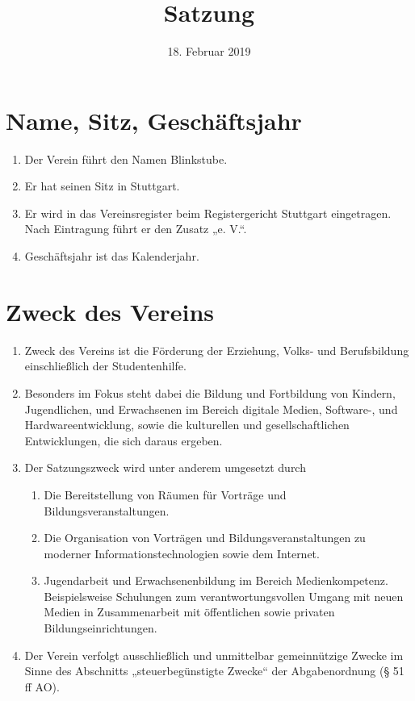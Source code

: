 \documentclass[a4paper, 12pt]{scrartcl}
\title{Satzung}
\subtitle{\verein}
\author{}
\date{18. Februar 2019}
\newcommand\verein{Blinkstube}
\begin{document}
\maketitle
\sffamily

\section{Name, Sitz, Geschäftsjahr}
\begin{enumerate}
  \item Der Verein führt den Namen \verein.
  \item Er hat seinen Sitz in Stuttgart.
  \item Er wird in das Vereinsregister beim Registergericht Stuttgart eingetragen. Nach Eintragung führt er den Zusatz „e. V.“.
  \item Geschäftsjahr ist das Kalenderjahr.
\end{enumerate}

\section{Zweck des Vereins}
\begin{enumerate}
  \item Zweck des Vereins ist die Förderung der Erziehung, Volks- und Berufsbildung einschließlich der Studentenhilfe.
  \item Besonders im Fokus steht dabei die Bildung und Fortbildung von Kindern, Jugendlichen, und Erwachsenen im Bereich digitale Medien, Software-, und Hardwareentwicklung, sowie die kulturellen und gesellschaftlichen Entwicklungen, die sich daraus ergeben.
  \item Der Satzungszweck wird unter anderem umgesetzt durch
  \begin{enumerate}
    \item Die Bereitstellung von Räumen für Vorträge und Bildungsveranstaltungen.
    \item Die Organisation von Vorträgen und Bildungsveranstaltungen zu moderner Informationstechnologien sowie dem Internet.
    \item Jugendarbeit und Erwachsenenbildung im Bereich Medienkompetenz. Beispielsweise Schulungen zum verantwortungsvollen Umgang mit neuen Medien in Zusammenarbeit mit öffentlichen sowie privaten Bildungseinrichtungen.
    \end{enumerate}
  \item Der Verein verfolgt ausschließlich und unmittelbar gemeinnützige Zwecke im Sinne des Abschnitts „steuerbegünstigte Zwecke“ der Abgabenordnung (§ 51 ff AO).
\end{enumerate}
\end{document}
